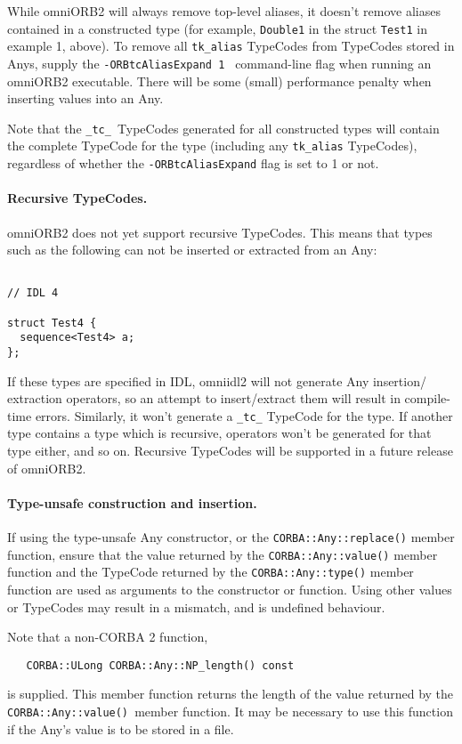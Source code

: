 \documentclass[11pt,twoside,onecolumn]{book}
\begin{document}
While omniORB2 will always remove top-level aliases, it doesn't remove aliases 
contained in a constructed type (for example, {\tt Double1} in the struct 
{\tt Test1} in example 1, above). To remove all {\tt tk\_alias} 
TypeCodes from TypeCodes stored in Anys, supply the {\tt -ORBtcAliasExpand 1 }
command-line flag when running an omniORB2 executable. There will be some 
(small) performance penalty when inserting values into an Any. 

Note that the {\tt \_tc\_ }TypeCodes generated for all constructed types will 
contain the complete TypeCode for the type (including any {\tt tk\_alias} 
TypeCodes), regardless of whether the {\tt -ORBtcAliasExpand} flag is set to 1
or not. 

\paragraph*{Recursive TypeCodes.}
omniORB2 does not yet support recursive TypeCodes. This means that types such 
as the following can not be inserted or extracted from an Any:
{\small
\begin{verbatim}
   
// IDL 4

struct Test4 {
  sequence<Test4> a;
};

\end{verbatim}
}
If these types are specified in IDL, omniidl2 will not generate Any insertion/
extraction operators, so an attempt to insert/extract them will result in 
compile-time errors. Similarly, it won't generate a {\tt \_tc\_} TypeCode for
the type. If another type contains a type which is recursive, operators won't 
be generated for that type either, and so on. Recursive TypeCodes will be 
supported in a future release of omniORB2.

\paragraph*{Type-unsafe construction and insertion.}
If using the type-unsafe Any constructor, or the {\tt CORBA::Any::replace()} 
member function, ensure that the value returned by the 
{\tt CORBA::Any::value()} member function and the TypeCode returned by the 
{\tt CORBA::Any::type()} member function are used as arguments to the 
constructor or function. Using other values or TypeCodes may result in a 
mismatch, and is undefined behaviour.

Note that a non-CORBA 2 function, 
{\small
\begin{verbatim}
   CORBA::ULong CORBA::Any::NP_length() const
\end{verbatim}
}
is supplied. This member function returns the length of the value returned 
by the {\tt CORBA::Any::value() }member function. It may be necessary to use 
this function if the Any's value is to be stored in a file.
\end{document}
